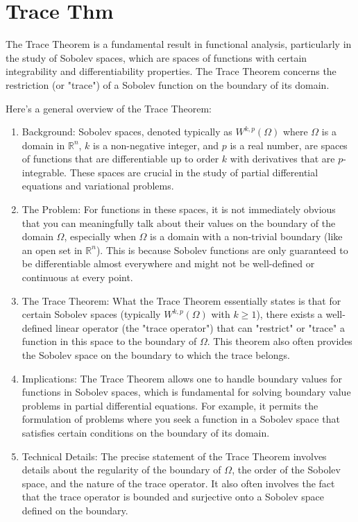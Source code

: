 \documentclass[a4paper,12pt]{article} %
\begin{document}
\newpage
\section{\textbf{Trace Thm}}

The Trace Theorem is a fundamental result in functional analysis, particularly in the study of Sobolev spaces, which are spaces of functions with certain integrability and differentiability properties. The Trace Theorem concerns the restriction (or "trace") of a Sobolev function on the boundary of its domain.

Here's a general overview of the Trace Theorem:
\begin{enumerate}
   \item Background: Sobolev spaces, denoted typically as \( W^{k,p}(\Omega) \) where \( \Omega \) is a domain in \( \mathbb{R}^n \), \( k \) is a non-negative integer, and \( p \) is a real number, are spaces of functions that are differentiable up to order \( k \) with derivatives that are \( p \)-integrable. These spaces are crucial in the study of partial differential equations and variational problems.

   \item The Problem: For functions in these spaces, it is not immediately obvious that you can meaningfully talk about their values on the boundary of the domain \( \Omega \), especially when \( \Omega \) is a domain with a non-trivial boundary (like an open set in \( \mathbb{R}^n \)). This is because Sobolev functions are only guaranteed to be differentiable almost everywhere and might not be well-defined or continuous at every point.

   \item The Trace Theorem: What the Trace Theorem essentially states is that for certain Sobolev spaces (typically \( W^{k,p}(\Omega) \) with \( k \geq 1 \)), there exists a well-defined linear operator (the "trace operator") that can "restrict" or "trace" a function in this space to the boundary of \( \Omega \). This theorem also often provides the Sobolev space on the boundary to which the trace belongs.

   \item Implications: The Trace Theorem allows one to handle boundary values for functions in Sobolev spaces, which is fundamental for solving boundary value problems in partial differential equations. For example, it permits the formulation of problems where you seek a function in a Sobolev space that satisfies certain conditions on the boundary of its domain.

   \item Technical Details: The precise statement of the Trace Theorem involves details about the regularity of the boundary of \( \Omega \), the order of the Sobolev space, and the nature of the trace operator. It also often involves the fact that the trace operator is bounded and surjective onto a Sobolev space defined on the boundary.
\end{enumerate}
\end{document}
